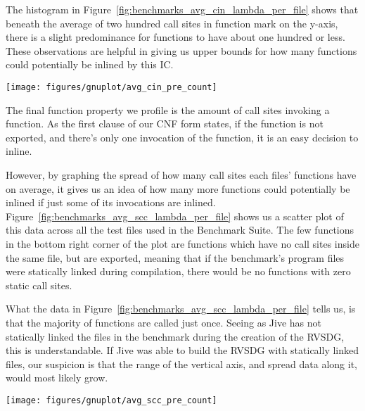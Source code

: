 The histogram in Figure~\ref{fig:benchmarks_avg_cin_lambda_per_file} shows that
beneath the average of two hundred call sites in function mark on the y-axis,
there is a slight predominance for functions to have about one hundred or less.
These observations are helpful in giving us upper bounds for how many functions
could potentially be inlined by this IC.

\begin{centering}
	\noindent\begin{minipage}{\textwidth}
		\captionsetup{type=figure}
		\hspace{-1em}
		\texttt{[image: figures/gnuplot/avg\_cin\_pre\_count]}
	\end{minipage}
	\label{fig:benchmarks_avg_cin_lambda_per_file}
\end{centering}

The final function property we profile is the amount of call sites invoking a
function. As the first clause of our CNF form states, if the function is not
exported, and there's only one invocation of the function, it is an easy
decision to inline.

However, by graphing the spread of how many call sites each files' functions
have on average, it gives us an idea of how many more functions could
potentially be inlined if just some of its invocations are inlined.
Figure~\ref{fig:benchmarks_avg_scc_lambda_per_file} shows us a scatter plot of
this data across all the test files used in the Benchmark Suite. The few
functions in the bottom right corner of the plot are functions which have no
call sites inside the same file, but are exported, meaning that if the
benchmark's program files were statically linked during compilation, there would
be no functions with zero static call sites.

What the data in Figure~\ref{fig:benchmarks_avg_scc_lambda_per_file} tells us,
is that the majority of functions are called just once. Seeing as Jive has not
statically linked the files in the benchmark during the creation of the RVSDG,
this is understandable. If Jive was able to build the RVSDG with statically
linked files, our suspicion is that the range of the vertical axis, and spread
data along it, would most likely grow.

\begin{centering}
	\noindent\begin{minipage}{\textwidth}
		\captionsetup{type=figure}
		\hspace{-1em}
		\texttt{[image: figures/gnuplot/avg\_scc\_pre\_count]}
	\end{minipage}
	\label{fig:benchmarks_avg_scc_lambda_per_file}
\end{centering}

